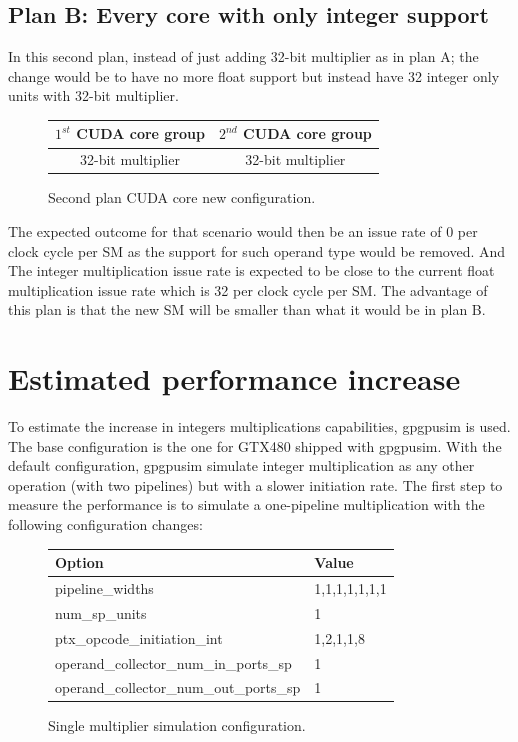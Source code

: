 \documentclass{report}
\begin{document}
   \subsection{Plan B: Every core with only integer support}
   In this second plan, instead of just adding 32-bit multiplier as in plan A; the change would be to have no more float support but instead have 32 integer only units with 32-bit multiplier.
   \begin{figure}[H]
      \centering
       \begin{tabular}{ | c | c | }
    	    \hline
    	    $1^{st}$ CUDA core group & $2^{nd}$ CUDA core group \\ \hline
    	   32-bit multiplier & 32-bit multiplier \\ \hline
  	\end{tabular}
  	\captionsetup{justification=centering}
  	\caption{Second plan CUDA core new configuration.}
  	\label{fig:planB_cores}
   \end{figure}
   The expected outcome for that scenario would then be an issue rate of 0 per clock cycle per SM as the support for such operand type would be removed.
   And The integer multiplication issue rate is expected to be close to the current float multiplication issue rate which is 32 per clock cycle per SM.
   The advantage of this plan is that the new SM will be smaller than what it would be in plan B. 
   \section{Estimated performance increase}
    To estimate the increase in integers multiplications capabilities, gpgpusim
    is used. The base configuration is the one for GTX480 shipped with gpgpusim.
    With the default configuration, gpgpusim simulate integer multiplication as
    any other operation (with two pipelines) but with a slower initiation rate.
    The first step to measure the performance is to simulate a one-pipeline
    multiplication with the following configuration changes:
    \begin{figure}[H]
    \centering
       \begin{tabular}{ | l | l | }
            \hline
    	    Option & Value \\ \hline
    	    pipeline\_widths & 1,1,1,1,1,1,1 \\
            num\_sp\_units & 1 \\
            ptx\_opcode\_initiation\_int & 1,2,1,1,8 \\
            operand\_collector\_num\_in\_ports\_sp & 1 \\
            operand\_collector\_num\_out\_ports\_sp & 1 \\ \hline

  	    \end{tabular}
  	\captionsetup{justification=centering}
  	\caption{Single multiplier simulation configuration.}
  	\label{tab:1stconfig}
    \end{figure}
\end{document}
